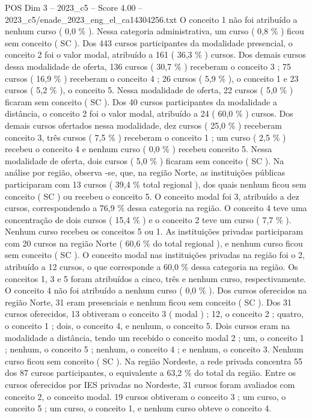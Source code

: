 \begin{textsample}{POS Dim 3 – 2023\_c5 – Score 4.00 – 2023\_c5/enade\_2023\_eng\_el\_ca14304256.txt}
O conceito 1 não foi atribuído a nenhum curso ( 0,0 \% ).
Nessa categoria administrativa, um curso ( 0,8 \% ) ficou sem conceito ( SC ).
Dos 443 cursos participantes da modalidade presencial, o conceito 2 foi o valor modal, atribuído a 161 ( 36,3 \% ) cursos.
Dos demais cursos dessa modalidade de oferta, 136 cursos ( 30,7 \% ) receberam o conceito 3 ; 75 cursos ( 16,9 \% ) receberam o conceito 4 ; 26 cursos ( 5,9 \% ), o conceito 1 e 23 cursos ( 5,2 \% ), o conceito 5.
Nessa modalidade de oferta, 22 cursos ( 5,0 \% ) ficaram sem conceito ( SC ).
Dos 40 cursos participantes da modalidade a distância, o conceito 2 foi o valor modal, atribuído a 24 ( 60,0 \% ) cursos.
Dos demais cursos ofertados nessa modalidade, dez cursos ( 25,0 \% ) receberam conceito 3, três cursos ( 7,5 \% ) receberam o conceito 1 ; um curso ( 2,5 \% ) recebeu o conceito 4 e nenhum curso ( 0,0 \% ) recebeu conceito 5.
Nessa modalidade de oferta, dois cursos ( 5,0 \% ) ficaram sem conceito ( SC ).
Na análise por região, observa -se, que, na região Norte, as instituições públicas participaram com 13 cursos ( 39,4 \% total regional ), dos quais nenhum ficou sem conceito ( SC ) ou recebeu o conceito 5.
O conceito modal foi 3, atribuído a dez cursos, correspondendo a 76,9 \% dessa categoria na região.
O conceito 4 teve uma concentração de dois cursos ( 15,4 \% ) e o conceito 2 teve um curso ( 7,7 \% ).
Nenhum curso recebeu os conceitos 5 ou 1.
As instituições privadas participaram com 20 cursos na região Norte ( 60,6 \% do total regional ), e nenhum curso ficou sem conceito ( SC ).
O conceito modal nas instituições privadas na região foi o 2, atribuído a 12 cursos, o que corresponde a 60,0 \% dessa categoria na região.
Os conceitos 1, 3 e 5 foram atribuídos a cinco, três e nenhum curso, respectivamente.
O conceito 4 não foi atribuído a nenhum curso ( 0,0 \% ).
Dos cursos oferecidos na região Norte, 31 eram presenciais e nenhum ficou sem conceito ( SC ).
Dos 31 cursos oferecidos, 13 obtiveram o conceito 3 ( modal ) ; 12, o conceito 2 ; quatro, o conceito 1 ; dois, o conceito 4, e nenhum, o conceito 5.
Dois cursos eram na modalidade a distância, tendo um recebido o conceito modal 2 ; um, o conceito 1 ; nenhum, o conceito 5 ; nenhum, o conceito 4 ; e nenhum, o conceito 3.
Nenhum curso ficou sem conceito ( SC ).
Na região Nordeste, a rede privada concentra 55 dos 87 cursos participantes, o equivalente a 63,2 \% do total da região.
Entre os cursos oferecidos por IES privadas no Nordeste, 31 cursos foram avaliados com conceito 2, o conceito modal. 19 cursos obtiveram o conceito 3 ; um curso, o conceito 5 ; um curso, o conceito 1, e nenhum curso obteve o conceito 4.

\end{textsample}
